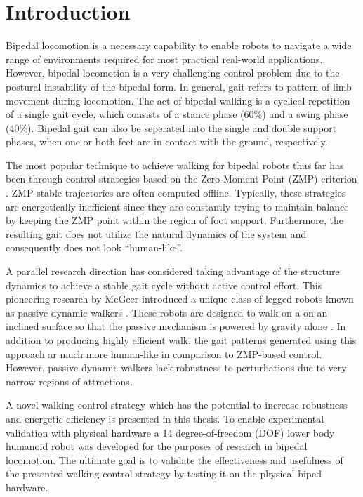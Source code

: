 \chapter{Introduction} %
\label{cha:introduction}
Bipedal locomotion is a necessary capability to enable robots to navigate a wide range of environments required for most practical real-world applications. However, bipedal locomotion is a very challenging control problem due to the postural instability of the bipedal form. In general, gait refers to pattern of limb movement during locomotion. The act of bipedal walking is a cyclical repetition of a single gait cycle, which consists of a stance phase (60\%) and a swing phase (40\%). Bipedal gait can also be seperated into the single and double support phases, when one or both feet are in contact with the ground, respectively. 

The most popular technique to achieve walking for bipedal robots thus far has been through control strategies based on the Zero-Moment Point (ZMP) criterion \cite{Vukobratovic:2004wy}. ZMP-stable trajectories are often computed offline. Typically, these strategies \cite{Kajita:1997vr,Sugihara:2002kq} are energetically inefficient since they are constantly trying to maintain balance by keeping the ZMP point within the region of foot support. Furthermore, the resulting gait does not utilize the natural dynamics of the system and consequently does not look ``human-like''. 

A parallel research direction has considered taking advantage of the structure dynamics to achieve a stable gait cycle without active control effort. This pioneering research by McGeer \cite{McGeer:1990uk} introduced a unique class of legged robots known as passive dynamic walkers \cite{Collins:2005vp}. These robots are designed to walk on a on an inclined surface so that the passive mechanism is powered by gravity alone \cite{Spong:1999vk}. In addition to producing highly efficient walk, the gait patterns generated using this approach ar much more human-like in comparison to ZMP-based control. However, passive dynamic walkers lack robustness to perturbations due to very narrow regions of attractions. 

A novel walking control strategy which has the potential to increase robustness and energetic efficiency is presented in this thesis. To enable experimental validation with physical hardware a 14 degree-of-freedom (DOF) lower body humanoid robot was developed for the purposes of research in bipedal locomotion. The ultimate goal is to validate the effectiveness and usefulness of the presented walking control strategy by testing it on the physical biped hardware. 

